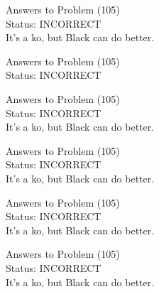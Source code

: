 \documentclass[11pt]{article}
\begin{document}
\begin{minipage}[t]{0.5\textwidth}
  {\centering
  
  Answers to Problem (105)\\
  Status: INCORRECT\\
  It's a ko, but Black can do better.\\
  }
\end{minipage}
\begin{minipage}[t]{0.5\textwidth}
  {\centering
  
  Answers to Problem (105)\\
  Status: INCORRECT\\
  
  }
\end{minipage}
\begin{minipage}[t]{0.5\textwidth}
  {\centering
  
  Answers to Problem (105)\\
  Status: INCORRECT\\
  It's a ko, but Black can do better.\\
  }
\end{minipage}
\begin{minipage}[t]{0.5\textwidth}
  {\centering
  
  Answers to Problem (105)\\
  Status: INCORRECT\\
  It's a ko, but Black can do better.\\
  }
\end{minipage}
\begin{minipage}[t]{0.5\textwidth}
  {\centering
  
  Answers to Problem (105)\\
  Status: INCORRECT\\
  It's a ko, but Black can do better.\\
  }
\end{minipage}
\begin{minipage}[t]{0.5\textwidth}
  {\centering
  
  Answers to Problem (105)\\
  Status: INCORRECT\\
  It's a ko, but Black can do better.\\
  }
\end{minipage}
\end{document}
